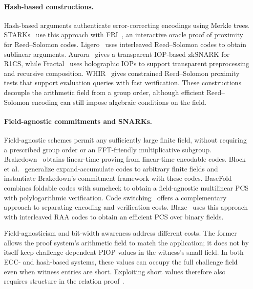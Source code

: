 \paragraph{Hash-based constructions.}
Hash-based arguments authenticate error-correcting encodings using
Merkle trees. STARKs~\cite{iacr/Ben-SassonBHR18} use this approach
with FRI~\cite{icalp/Ben-SassonBHR18}, an interactive oracle proof
of proximity for Reed--Solomon codes.
Ligero~\cite{dcc/AmesHIV23} uses interleaved Reed--Solomon codes
to obtain sublinear arguments.
Aurora~\cite{eurocrypt/Ben-SassonCRSVW19} gives a transparent
IOP-based zkSNARK for R1CS, while
Fractal~\cite{eurocrypt/ChiesaOS20} uses holographic IOPs to
support transparent preprocessing and recursive composition.
WHIR~\cite{eurocrypt/ArnonCFY25} gives constrained Reed--Solomon
proximity tests that support evaluation queries with fast verification.
These constructions decouple the arithmetic field from a group
order, although efficient Reed--Solomon encoding can still impose
algebraic conditions on the field.

\paragraph{Field-agnostic commitments and SNARKs.}
Field-agnostic schemes permit any sufficiently large finite field,
without requiring a prescribed group order or an FFT-friendly
multiplicative subgroup.
Brakedown~\cite{crypto/GolovnevLSTW23} obtains linear-time proving
from linear-time encodable codes.
Block et al.~\cite{crypto/BlockFKTWZ24} generalize
expand-accumulate codes to arbitrary finite fields and instantiate
Brakedown's commitment framework with these codes.
BaseFold~\cite{crypto/ZeilbergerCF24} combines foldable codes with
sumcheck to obtain a field-agnostic multilinear PCS with
polylogarithmic verification.
Code switching~\cite{jacm/RonZewiR24} offers a complementary
approach to separating encoding and verification costs.
Blaze~\cite{eurocrypt/BrehmCFRRZ25} uses this approach with
interleaved RAA codes to obtain an efficient PCS over binary fields.

Field-agnosticism and bit-width awareness address different costs.
The former allows the proof system's arithmetic field to match the
application; it does not by itself keep challenge-dependent PIOP
values in the witness's small field.
In both ECC- and hash-based systems, these values can occupy the
full challenge field even when witness entries are short.
Exploiting short values therefore also requires structure in the
relation proof~\cite{eurocrypt/DiamondP25,iacr/BagadDDT25}.

